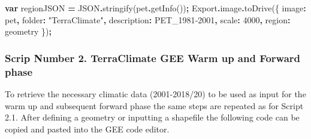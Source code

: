 \documentclass[
  10pt,
  b5paper,
]{book}
\newenvironment{Shaded}{\begin{snugshade}}{\end{snugshade}}
\newcommand{\AttributeTok}[1]{\textcolor[rgb]{0.77,0.63,0.00}{#1}}
\newcommand{\BuiltInTok}[1]{#1}
\newcommand{\DataTypeTok}[1]{\textcolor[rgb]{0.13,0.29,0.53}{#1}}
\newcommand{\DecValTok}[1]{\textcolor[rgb]{0.00,0.00,0.81}{#1}}
\newcommand{\FunctionTok}[1]{\textcolor[rgb]{0.00,0.00,0.00}{#1}}
\newcommand{\KeywordTok}[1]{\textcolor[rgb]{0.13,0.29,0.53}{\textbf{#1}}}
\newcommand{\NormalTok}[1]{#1}
\newcommand{\OperatorTok}[1]{\textcolor[rgb]{0.81,0.36,0.00}{\textbf{#1}}}
\newcommand{\StringTok}[1]{\textcolor[rgb]{0.31,0.60,0.02}{#1}}
\begin{document}
\begin{Shaded}
\begin{Highlighting}[]
\KeywordTok{var}\NormalTok{ regionJSON }\OperatorTok{=} \BuiltInTok{JSON}\OperatorTok{.}\FunctionTok{stringify}\NormalTok{(pet}\OperatorTok{.}\FunctionTok{getInfo}\NormalTok{())}\OperatorTok{;}
\NormalTok{Export}\OperatorTok{.}\AttributeTok{image}\OperatorTok{.}\FunctionTok{toDrive}\NormalTok{(\{}
          \DataTypeTok{image}\OperatorTok{:}\NormalTok{ pet}\OperatorTok{,}
          \DataTypeTok{folder}\OperatorTok{:} \StringTok{"TerraClimate"}\OperatorTok{,}
          \DataTypeTok{description}\OperatorTok{:} \StringTok{\textquotesingle{}PET\_1981{-}2001\textquotesingle{}}\OperatorTok{,} 
          \DataTypeTok{scale}\OperatorTok{:} \DecValTok{4000}\OperatorTok{,}
          \DataTypeTok{region}\OperatorTok{:}\NormalTok{ geometry}
\NormalTok{\})}\OperatorTok{;}
\end{Highlighting}
\end{Shaded}

\hypertarget{scrip-number-2.-terraclimate-gee-warm-up-and-forward-phase}{%
\subsubsection{Scrip Number 2. TerraClimate GEE Warm up and Forward phase}\label{scrip-number-2.-terraclimate-gee-warm-up-and-forward-phase}}

To retrieve the necessary climatic data (2001-2018/20) to be used as input for the warm up and subsequent forward phase the same steps are repeated as for Script 2.1. After defining a geometry or inputting a shapefile the following code can be copied and pasted into the GEE code editor.
\end{document}
